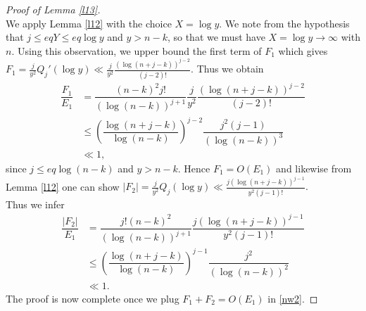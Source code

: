 \documentclass[12pt]{amsart}
\numberwithin{equation}{section}
\theoremstyle{remark}
\theoremstyle{remark}
\theoremstyle{definition}
\begin{document}
\begin{proof}[Proof of Lemma \ref{l13}]
\begin{equation}
\end{equation}
We apply Lemma \ref{l12}  with the choice $X=\log y$. We note from the hypothesis that $j\leqslant eqY \leqslant eq\log y$ and $y>n-k$, so that we must have $X=\log y\to\infty$ with $n$. Using this observation, we upper bound the first term of $F_1$ which gives
$F_1=\frac{j}{y^2}Q_j'(\log y)\ll \frac{j}{y^2} \frac{(\log(n+j-k))^{j-2}}{(j-2)!}.$ Thus we obtain\\
\begin{align}
\nonumber
\dfrac{F_1}{E_1} &= \dfrac{(n-k)^2j!}{(\log(n-k))^{j+1}} \dfrac{j}{y^2} \dfrac{(\log(n+j-k))^{j-2}}{(j-2)!}\\
\nonumber
&\leqslant\left(\dfrac{\log(n+j-k)}{\log(n-k)}\right)^{j-2} \dfrac{j^2(j-1)}{(\log(n-k))^3}\\
\nonumber
&\ll 1,
\end{align}
since $j\leqslant eq \log(n-k)$ and $y>n-k.$
Hence $F_1=O(E_1)$ and likewise from Lemma \ref{l12} one can show
$|F_2|=\frac{j}{y^2}Q_j(\log y)\ll \frac{j(\log(n+j-k))^{j-1}}{y^2(j-1)!}.$\\
Thus we infer
\begin{align}
\nonumber
\dfrac{|F_2|}{E_1} &= \dfrac{j!(n-k)^2}{(\log(n-k))^{j+1}}\dfrac{j(\log(n+j-k))^{j-1}}{y^2(j-1)!}\\
\nonumber
&\leqslant \left( \dfrac{\log(n+j-k)}{\log(n-k)}\right)^{j-1}\dfrac{j^2}{(\log(n-k))^2}\\
\nonumber
&\ll 1.
\end{align}
The proof is now complete once we plug $F_1+F_2=O(E_1)$ in \eqref{nw2}.
\end{proof}
\end{document}
